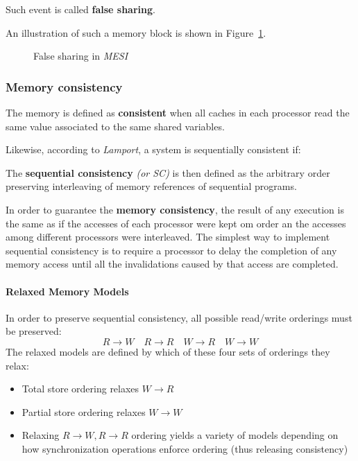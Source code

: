 \documentclass[english]{article}
\begin{document}
Such event is called \textbf{false sharing}.

\bigskip
An illustration of such a memory block is shown in Figure~\ref{fig:MESI-false-sharing}.

\begin{figure}[htbp]
  \centering
  \bigskip
  \caption{False sharing in \textit{MESI}}
  \label{fig:MESI-false-sharing}
  \bigskip
\end{figure}

\subsubsection{Memory consistency}

The memory is defined as \textbf{consistent} when all caches in each processor read the same value associated to the same shared variables.

Likewise, according to \textit{Lamport}, a system is sequentially consistent if:


The \textbf{sequential consistency} \textit{(or SC)} is then defined as the arbitrary order preserving interleaving of memory references of sequential programs.

\bigskip
In order to guarantee the \textbf{memory consistency}, the result of any execution is the same as if the accesses of each processor were kept om order an the accesses among different processors were interleaved.
The simplest way to implement sequential consistency is to require a processor to delay the completion of any memory access until all the invalidations caused by that access are completed.

\paragraph{Relaxed Memory Models}

In order to preserve sequential consistency, all possible read/write orderings must be preserved:
\[R \rightarrow W \quad R \rightarrow R \quad W \rightarrow R \quad W \rightarrow W\]
The relaxed models are defined by which of these four sets of orderings they relax:

\begin{itemize}
  \item Total store ordering relaxes \(W \rightarrow R\)
  \item Partial store ordering relaxes \(W \rightarrow W\)
  \item Relaxing \(R \rightarrow W, R \rightarrow R\) ordering yields a variety of models depending on how synchronization operations enforce ordering (thus releasing consistency)
\end{itemize}
\end{document}
